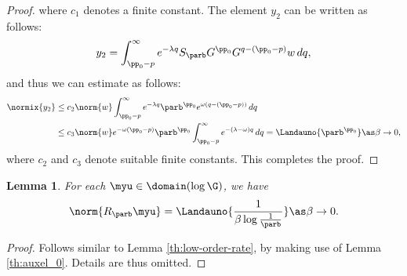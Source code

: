 \documentclass[10pt]{article}
\newtheorem{lemma}[theorem]{Lemma}
\theoremstyle{definition}
\begin{document}
\begin{proof}
%
where $ c_1 $ denotes a finite constant.
The element $ y_2 $ can be written as follows:
%
\begin{align*}
y_2 = \int_{\pp_0-p}^\infty e^{-\lambda q} S_\parb G^{\pp_0} G^{q-(\pp_0-p)} w \, dq,
\end{align*}
%
and thus we can estimate as follows:
%
\begin{align*}
\normix{y_2} & \le  c_2 \norm{w} \int_{\pp_0-p}^\infty e^{-\lambda q} \parb^{\pp_0} e^{\omega(q-(\pp_0-p))} \, dq
\\
& \le c_3 \norm{w} e^{-\omega(\pp_0-p)} \parb^{\pp_0}  \int_{\pp_0-p}^\infty e^{-(\lambda-\omega)q} \, dq
=\Landauno{ \parb^{\pp_0}} \as \beta \to 0,
\end{align*}
%
where $ c_2 $ and $ c_3 $ denote suitable finite constants.
This completes the proof.
\end{proof}
%
\begin{lemma}
\label{th:low-order-rate-b}
For each $ \myu \in \domain(\log \G) $, we have
$$
\norm{ R_\parb \myu  } =
\Landauno{\frac{1}{\beta \log \frac{1}{\parb}}}
\as \beta \to 0.
$$
\end{lemma}
%
\begin{proof}
Follows similar to Lemma \ref{th:low-order-rate}, by making use of
Lemma \ref{th:auxel_0}. Details are thus omitted.
\end{proof}
%
\end{document}
